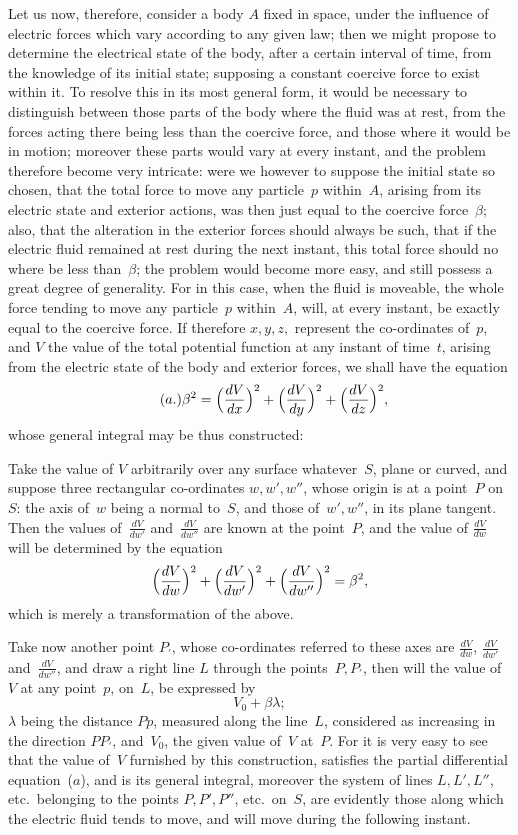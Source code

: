 \documentclass[11pt,notitlepage]{amsart}
\begin{document}
Let us now, therefore, consider a body $A$ fixed in space, under the
influence of electric forces which vary according to any given law; then we
might propose to determine the electrical state of the body, after a certain
interval of time, from the knowledge of its initial state; supposing a constant
coercive force to exist within it. To resolve this in its most general form,
it would be necessary to distinguish between those parts of the body where
the fluid was at rest, from the forces acting there being less than the 
coercive force, and those where it would be in motion; moreover these parts
would vary at every instant, and the problem therefore become very intricate:
were we however to suppose the initial state so chosen, that the total force
to move any particle~$p$ within~$A$,
arising from its electric state and exterior
actions, was then just equal to the coercive force~$\beta$;
also, that the alteration
in the exterior forces should always be such, that if the electric fluid 
remained at rest during the next instant, this total force should no where be
less than~$\beta$;
the problem would become more easy, and still possess a great
degree of generality. For in this case, when the fluid is moveable, the whole
force tending to move any particle~$p$ within~$A$, will, at every instant, be
exactly equal to the coercive force. If therefore $x,y,z,$ represent the
co-ordinates of~$p$, and $V$ the value of the total
potential function at any instant
of time~$t$, arising from the electric state of the body and exterior forces, we
shall have the equation
\[
\tag{$a$.}
\beta^2=
\Bigl(\frac{dV}{dx}\Bigr)^2
+\Bigl(\frac{dV}{dy}\Bigr)^2
+\Bigl(\frac{dV}{dz}\Bigr)^2,
\]
whose general integral may be thus constructed:

Take the value of $V$ arbitrarily over any surface whatever~$S$, plane
or curved, and suppose three rectangular co-ordinates $w,w',w''$, whose
origin is at a point~$P$ on~$S$: the axis of~$w$ being a normal to~$S$,
and those of~$w',w''$, in its plane tangent.
Then the values of~$\frac{dV}{dw'}$ and~$\frac{dV}{dw''}$ are known
at the point~$P$,
and the value of $\frac{dV}{dw}$ will be determined by the equation
\[
\Bigl(\frac{dV}{dw}\Bigr)^2
+\Bigl(\frac{dV}{dw'}\Bigr)^2
+\Bigl(\frac{dV}{dw''}\Bigr)^2=\beta^2,
\]
which is merely a transformation of the above.

Take now another point $P_\prime$, whose co-ordinates referred to these
axes are $\frac{dV}{dw}$, $\frac{dV}{dw'}$ and~$\frac{dV}{dw''}$,
and draw a right line $L$ through the points~$P,P_\prime$,
then will the value of~$V$ at any point~$p$, on~$L$, be expressed by
\[
V_0+\beta\lambda;
\]
$\lambda$ being the distance $Pp$, measured along the line~$L$,
considered as increasing
in the direction $PP_\prime$, and~$V_0$,
the given value of~$V$ at~$P$. For it is very
easy to see that the value of~$V$ furnished by this construction, satisfies the
partial differential equation~($a$),
and is its general integral, moreover the system
of lines $L, L', L''$, etc.\ belonging to the
points $P, P', P''$, etc.\ on~$S$, are
evidently those along which the electric fluid tends to move, and will move
during the following instant.
\end{document}
